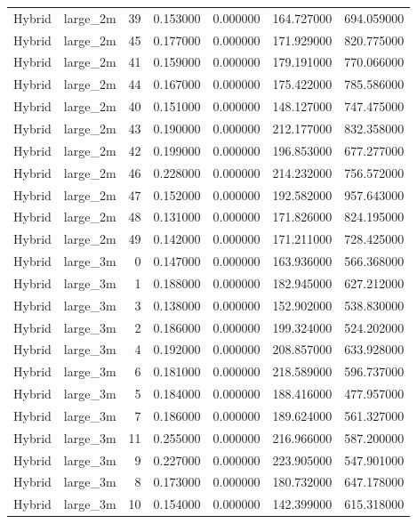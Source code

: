 \begin{tabular}{llrrrrr}
Hybrid & large_2m & 39 & 0.153000 & 0.000000 & 164.727000 & 694.059000 \\
Hybrid & large_2m & 45 & 0.177000 & 0.000000 & 171.929000 & 820.775000 \\
Hybrid & large_2m & 41 & 0.159000 & 0.000000 & 179.191000 & 770.066000 \\
Hybrid & large_2m & 44 & 0.167000 & 0.000000 & 175.422000 & 785.586000 \\
Hybrid & large_2m & 40 & 0.151000 & 0.000000 & 148.127000 & 747.475000 \\
Hybrid & large_2m & 43 & 0.190000 & 0.000000 & 212.177000 & 832.358000 \\
Hybrid & large_2m & 42 & 0.199000 & 0.000000 & 196.853000 & 677.277000 \\
Hybrid & large_2m & 46 & 0.228000 & 0.000000 & 214.232000 & 756.572000 \\
Hybrid & large_2m & 47 & 0.152000 & 0.000000 & 192.582000 & 957.643000 \\
Hybrid & large_2m & 48 & 0.131000 & 0.000000 & 171.826000 & 824.195000 \\
Hybrid & large_2m & 49 & 0.142000 & 0.000000 & 171.211000 & 728.425000 \\
Hybrid & large_3m & 0 & 0.147000 & 0.000000 & 163.936000 & 566.368000 \\
Hybrid & large_3m & 1 & 0.188000 & 0.000000 & 182.945000 & 627.212000 \\
Hybrid & large_3m & 3 & 0.138000 & 0.000000 & 152.902000 & 538.830000 \\
Hybrid & large_3m & 2 & 0.186000 & 0.000000 & 199.324000 & 524.202000 \\
Hybrid & large_3m & 4 & 0.192000 & 0.000000 & 208.857000 & 633.928000 \\
Hybrid & large_3m & 6 & 0.181000 & 0.000000 & 218.589000 & 596.737000 \\
Hybrid & large_3m & 5 & 0.184000 & 0.000000 & 188.416000 & 477.957000 \\
Hybrid & large_3m & 7 & 0.186000 & 0.000000 & 189.624000 & 561.327000 \\
Hybrid & large_3m & 11 & 0.255000 & 0.000000 & 216.966000 & 587.200000 \\
Hybrid & large_3m & 9 & 0.227000 & 0.000000 & 223.905000 & 547.901000 \\
Hybrid & large_3m & 8 & 0.173000 & 0.000000 & 180.732000 & 647.178000 \\
Hybrid & large_3m & 10 & 0.154000 & 0.000000 & 142.399000 & 615.318000 \\

\end{tabular}
